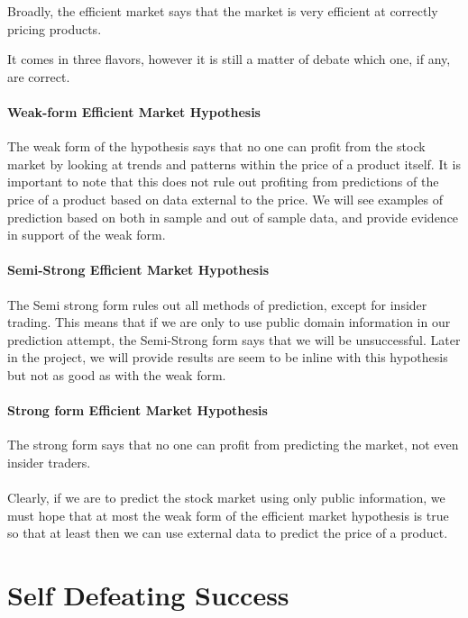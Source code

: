 \documentclass{report}
\begin{document}
Broadly, the efficient market says that the market is very efficient at correctly pricing products.

It comes in three flavors, however it is still a matter of debate which one, if any, are correct.

\paragraph{Weak-form Efficient Market Hypothesis}
The weak form of the hypothesis says that no one can profit from the stock market by looking at trends and patterns within the price of a product itself. It is important to note that this does not rule out profiting from predictions of the price of a product based on data external to the price. We will see examples of prediction based on both in sample and out of sample data, and provide evidence in support of the weak form.

\paragraph{Semi-Strong Efficient Market Hypothesis}
The Semi strong form rules out all methods of prediction, except for insider trading. This means that if we are only to use public domain information in our prediction attempt, the Semi-Strong form says that we will be unsuccessful. Later in the project, we will provide results are seem to be inline with this hypothesis but not as good as with the weak form.

\paragraph{Strong form Efficient Market Hypothesis}
The strong form says that no one can profit from predicting the market, not even insider traders.

\paragraph{}

Clearly, if we are to predict the stock market using only public information, we must hope that at most the weak form of the efficient market hypothesis is true so that at least then we can use external data to predict the price of a product.

\section{Self Defeating Success}
\end{document}
